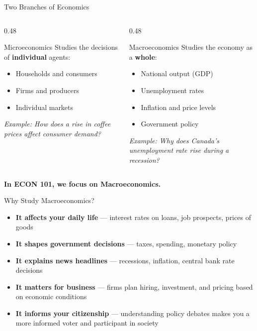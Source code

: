 \documentclass[aspectratio=169]{beamer}
\begin{document}
\begin{frame}{Two Branches of Economics}
\transfade
\begin{columns}
  \begin{column}{0.48\textwidth}
    \begin{block}{Microeconomics}
      Studies the decisions of \textbf{individual} agents:
      \begin{itemize}
        \item Households and consumers
        \item Firms and producers
        \item Individual markets
      \end{itemize}
      \vspace{0.3em}
      \textit{Example: How does a rise in coffee prices affect consumer demand?}
    \end{block}
  \end{column}
  \begin{column}{0.48\textwidth}
    \begin{block}{Macroeconomics}
      Studies the economy as a \textbf{whole}:
      \begin{itemize}
        \item National output (GDP)
        \item Unemployment rates
        \item Inflation and price levels
        \item Government policy
      \end{itemize}
      \vspace{0.3em}
      \textit{Example: Why does Canada's unemployment rate rise during a recession?}
    \end{block}
  \end{column}
\end{columns}
\vspace{0.4em}
\centering \textcolor{accent}{\textbf{In ECON 101, we focus on Macroeconomics.}}
\end{frame}

\begin{frame}{Why Study Macroeconomics?}

\begin{itemize}
  \item \textbf{It affects your daily life} --- interest rates on loans, job prospects, prices of goods
  \item \textbf{It shapes government decisions} --- taxes, spending, monetary policy
  \item \textbf{It explains news headlines} --- recessions, inflation, central bank rate decisions
  \item \textbf{It matters for business} --- firms plan hiring, investment, and pricing based on economic conditions
  \item \textbf{It informs your citizenship} --- understanding policy debates makes you a more informed voter and participant in society
\end{itemize}
\end{frame}
\end{document}
